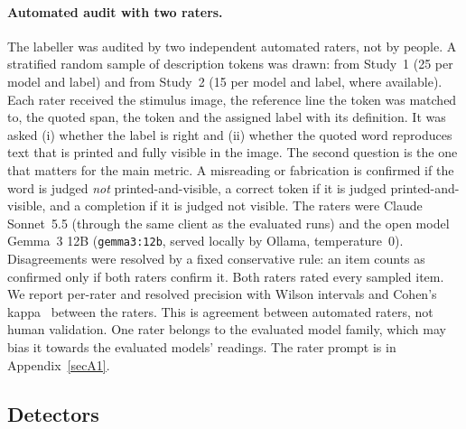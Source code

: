 \paragraph{Automated audit with two raters.} The labeller was audited by two independent automated raters, not by people. A stratified random sample of description tokens was drawn: \SynAudN{} from Study~1 (25 per model and label) and \RealAudN{} from Study~2 (15 per model and label, where available). Each rater received the stimulus image, the reference line the token was matched to, the quoted span, the token and the assigned label with its definition. It was asked (i) whether the label is right and (ii) whether the quoted word reproduces text that is printed and fully visible in the image. The second question is the one that matters for the main metric. A misreading or fabrication is confirmed if the word is judged \emph{not} printed-and-visible, a correct token if it is judged printed-and-visible, and a completion if it is judged not visible. The raters were Claude Sonnet~5.5 (through the same client as the evaluated runs) and the open model Gemma~3 12B (\texttt{gemma3:12b}, served locally by Ollama, temperature~0). Disagreements were resolved by a fixed conservative rule: an item counts as confirmed only if both raters confirm it. Both raters rated every sampled item. We report per-rater and resolved precision with Wilson intervals and Cohen's kappa~\cite{cohen1960coefficient} between the raters. This is agreement between automated raters, not human validation. One rater belongs to the evaluated model family, which may bias it towards the evaluated models' readings. The rater prompt is in Appendix~\ref{secA1}.

\subsection{Detectors}\label{sec:detectors}

